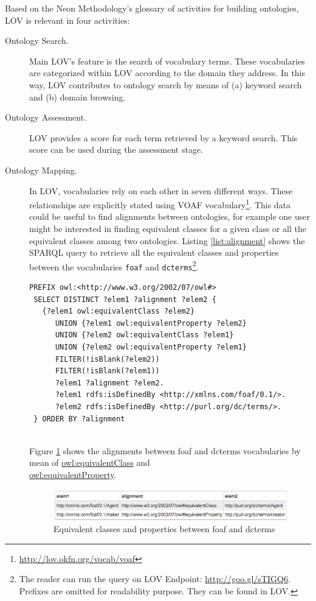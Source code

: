 \documentclass{iosart2c}
\begin{document}
Based on the Neon Methodology's glossary of activities for building ontologies, LOV is relevant in four activities:

\begin{description}

 \item [Ontology Search.] Main LOV's feature is the search of vocabulary terms. These vocabularies are categorized within LOV according to the domain they address. In this way, LOV contributes to ontology search by means of (a) keyword search and (b) domain browsing.
 \item [Ontology Assessment.] LOV provides a score for each term retrieved by a keyword search. This score can be used during the assessment stage.
 \item [Ontology Mapping.] In LOV, vocabularies rely on each other in seven different ways. These relationships are explicitly stated using VOAF vocabulary\footnote{\url{http://lov.okfn.org/vocab/voaf}}. This data could be useful to find alignments between ontologies, for example one user might be interested in finding equivalent classes for a given class or all the equivalent classes among two ontologies. Listing \ref{list:alignment} shows the SPARQL query to retrieve all the equivalent classes and properties between the vocabularies \texttt{foaf} and \texttt{dcterms}\footnote{The reader can run the query on LOV Endpoint: \url{http://goo.gl/sTIGQ6}. Prefixes are omitted for readability purpose. They can be found in LOV.}.
     
 \begin{lstlisting}[basicstyle=\tiny,float=htb,caption={SPARQL query asking for all the equivalent classes and properties between the vocabularies foaf and dcterms. },label=list:alignment, language=turtle]
 PREFIX owl:<http://www.w3.org/2002/07/owl#>
 SELECT DISTINCT ?elem1 ?alignment ?elem2 {
   {?elem1 owl:equivalentClass ?elem2}
      UNION {?elem1 owl:equivalentProperty ?elem2}
      UNION {?elem2 owl:equivalentClass ?elem1}
      UNION {?elem2 owl:equivalentProperty ?elem1}
      FILTER(!isBlank(?elem2))
      FILTER(!isBlank(?elem1))
      ?elem1 ?alignment ?elem2.
      ?elem1 rdfs:isDefinedBy <http://xmlns.com/foaf/0.1/>.
      ?elem2 rdfs:isDefinedBy <http://purl.org/dc/terms/>.
 } ORDER BY ?alignment
	
	\end{lstlisting}
	
	Figure \ref{fig:eqCR} shows the alignments between foaf and dcterms vocabularies by mean of \url{owl:equivalentClass} and \\ \url{owl:equivalentProperty}.
    \begin{figure}
      \centering
      \includegraphics[width=1.0\linewidth]{equivalentCandR.png}
      \caption{Equivalent classes and properties between foaf and dcterms}
      \label{fig:eqCR}
    \end{figure}
    

\end{description}
\end{document}
